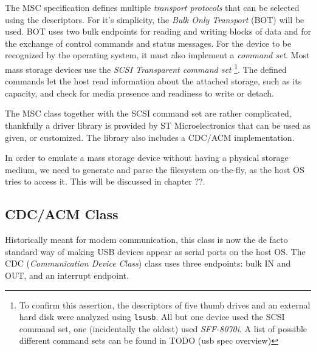 The MSC specification defines multiple \textit{transport protocols} that can be selected using the descriptors. For it's simplicity, the \textit{Bulk Only Transport} (BOT) will be used. BOT uses two bulk endpoints for reading and writing blocks of data and for the exchange of control commands and status messages. For the device to be recognized by the operating system, it must also implement a \textit{command set}. Most mass storage devices use the \textit{SCSI Transparent command set} 
\footnote{To confirm this assertion, the descriptors of five thumb drives and an external hard disk were analyzed using \verb|lsusb|. All but one device used the SCSI command set, one (incidentally the oldest) used \textit{SFF-8070i}. A list of possible different command sets can be found in TODO (usb spec overview)}.
The defined commands let the host read information about the attached storage, such as its capacity, and check for media presence and readiness to write or detach.






The MSC class together with the SCSI command set are rather complicated, thankfully a driver library is provided by ST Microelectronics that can be used as given, or customized. The library also includes a CDC/ACM implementation.

In order to emulate a mass storage device without having a physical storage medium, we need to generate and parse the filesystem on-the-fly, as the host OS tries to access it. This will be discussed in chapter ??.

\subsection{CDC/ACM Class}


Historically meant for modem communication, this class is now the de facto standard way of making USB devices appear as serial ports on the host OS. The CDC (\textit{Communication Device Class}) class uses three endpoints: bulk IN and OUT, and an interrupt endpoint. 

